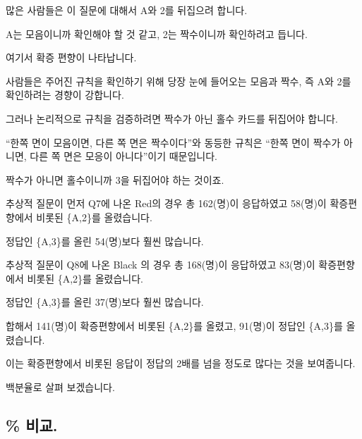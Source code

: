 \documentclass[
]{book}
\begin{document}
많은 사람들은 이 질문에 대해서 A와 2를 뒤집으려 합니다.

A는 모음이니까 확인해야 할 것 같고, 2는 짝수이니까 확인하려고 듭니다.

여기서 확증 편향이 나타납니다.

사람들은 주어진 규칙을 확인하기 위해 당장 눈에 들어오는 모음과 짝수, 즉 A와 2를 확인하려는 경향이 강합니다.

그러나 논리적으로 규칙을 검증하려면 짝수가 아닌 홀수 카드를 뒤집어야 합니다.

``한쪽 면이 모음이면, 다른 쪽 면은 짝수이다''와 동등한 규칙은 ``한쪽 면이 짝수가 아니면, 다른 쪽 면은 모응이 아니다''이기 때문입니다.

짝수가 아니면 홀수이니까 3을 뒤집어야 하는 것이죠.

추상적 질문이 먼저 Q7에 나온 Red의 경우 총 162(명)이 응답하였고 58(명)이 확증편향에서 비롯된 \{A,2\}를 올렸습니다.

정답인 \{A,3\}를 올린 54(명)보다 훨씬 많습니다.

추상적 질문이 Q8에 나온 Black 의 경우 총 168(명)이 응답하였고 83(명)이 확증편향에서 비롯된 \{A,2\}를 올렸습니다.

정답인 \{A,3\}를 올린 37(명)보다 훨씬 많습니다.

합해서 141(명)이 확증편향에서 비롯된 \{A,2\}를 올렸고, 91(명)이 정답인 \{A,3\}를 올렸습니다.

이는 확증편향에서 비롯된 응답이 정답의 2배를 넘을 정도로 많다는 것을 보여줍니다.

백분율로 살펴 보겠습니다.

\subsection{\% 비교.}\label{uxbe44uxad50.-4}
\end{document}
